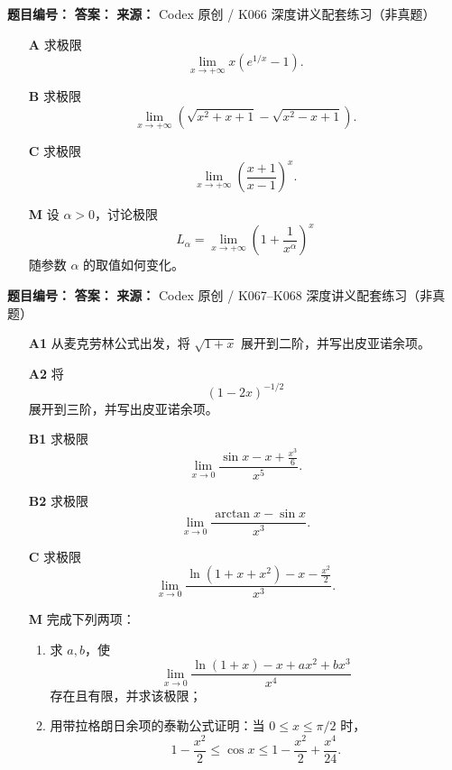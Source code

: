 \begin{problemBox}
\begin{problemMeta}
\textbf{题目编号：}  \quad
\textbf{答案：}  \quad
\textbf{来源：} Codex 原创 / K066 深度讲义配套练习（非真题）
\end{problemMeta}

\begin{enumerate}
  \item[\textbf{A}] 求极限
  \[
  \lim_{x\to+\infty}x\left(e^{1/x}-1\right).
  \]

  \item[\textbf{B}] 求极限
  \[
  \lim_{x\to+\infty}
  \left(\sqrt{x^2+x+1}-\sqrt{x^2-x+1}\right).
  \]

  \item[\textbf{C}] 求极限
  \[
  \lim_{x\to+\infty}\left(\frac{x+1}{x-1}\right)^x.
  \]

  \item[\textbf{M}] 设 \(\alpha>0\)，讨论极限
  \[
  L_\alpha=
  \lim_{x\to+\infty}\left(1+\frac1{x^\alpha}\right)^x
  \]
  随参数 \(\alpha\) 的取值如何变化。
\end{enumerate}
\end{problemBox}

\begin{problemBox}
\begin{problemMeta}
\textbf{题目编号：}  \quad
\textbf{答案：}  \quad
\textbf{来源：} Codex 原创 / K067--K068 深度讲义配套练习（非真题）
\end{problemMeta}

\begin{enumerate}
  \item[\textbf{A1}] 从麦克劳林公式出发，将
  \(\sqrt{1+x}\) 展开到二阶，并写出皮亚诺余项。

  \item[\textbf{A2}] 将
  \[
  (1-2x)^{-1/2}
  \]
  展开到三阶，并写出皮亚诺余项。

  \item[\textbf{B1}] 求极限
  \[
  \lim_{x\to0}
  \frac{\sin x-x+\frac{x^3}{6}}{x^5}.
  \]

  \item[\textbf{B2}] 求极限
  \[
  \lim_{x\to0}\frac{\arctan x-\sin x}{x^3}.
  \]

  \item[\textbf{C}] 求极限
  \[
  \lim_{x\to0}
  \frac{\ln(1+x+x^2)-x-\frac{x^2}{2}}{x^3}.
  \]

  \item[\textbf{M}] 完成下列两项：
  \begin{enumerate}
    \item 求 \(a,b\)，使
    \[
    \lim_{x\to0}
    \frac{\ln(1+x)-x+ax^2+bx^3}{x^4}
    \]
    存在且有限，并求该极限；
    \item 用带拉格朗日余项的泰勒公式证明：当
    \(0\le x\le\pi/2\) 时，
    \[
    1-\frac{x^2}{2}
    \le \cos x
    \le 1-\frac{x^2}{2}+\frac{x^4}{24}.
    \]
  \end{enumerate}
\end{enumerate}
\end{problemBox}

